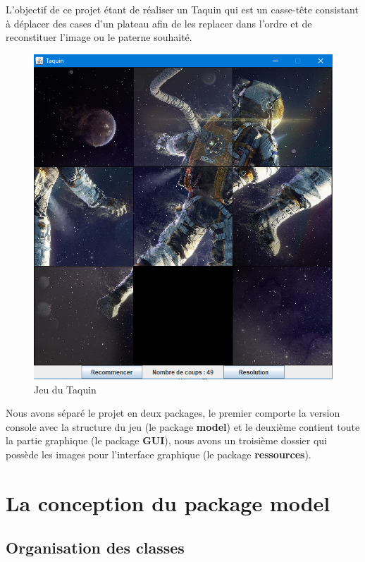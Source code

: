 \documentclass[a4paper,12pt]{article} %
\begin{document}
L'objectif de ce projet étant de réaliser un Taquin qui est un casse-tête consistant à déplacer des cases d'un plateau afin de les replacer dans l'ordre et de reconstituer l'image ou le paterne souhaité.

\begin{figure}[!h]
\centering
\includegraphics[scale=0.5]{images/Capture.PNG}
\caption{Jeu du Taquin}
\end{figure}

Nous avons séparé le projet en deux packages, le premier comporte la version console avec la structure du jeu (le package \textbf{model}) et le deuxième contient toute la partie graphique (le package \textbf{GUI}), nous avons un troisième dossier qui possède les images pour l'interface graphique (le package \textbf{ressources}).

\section{La conception du package model}

\subsection{Organisation des classes}
\end{document}
